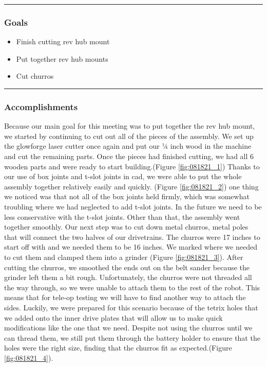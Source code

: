 \noindent\hfil\rule{\textwidth}{.4pt}\hfil
\subsubsection*{Goals}
\begin{itemize}
    \item Finish cutting rev hub mount
	\item Put together rev hub mounts
	\item Cut churros
  

\end{itemize} 

\noindent\hfil\rule{\textwidth}{.4pt}\hfil

\subsubsection*{Accomplishments}
Because our main goal for this meeting was to put together the rev hub mount, we started by continuing to cut out all of the pieces of the assembly. We set up the glowforge laser cutter once again and put our ¼ inch wood in the machine and cut the remaining parts. Once the pieces had finished cutting, we had all 6 wooden parts and were ready to start building.(Figure \ref{fig:081821_1})
Thanks to our use of box joints and t-slot joints in cad, we were able to put the whole assembly together relatively easily and quickly. (Figure \ref{fig:081821_2}) one thing we noticed was that not all of the box joints held firmly, which was somewhat troubling where we had neglected to add t-slot joints. In the future we need to be less conservative with the t-slot joints. Other than that, the assembly went together smoothly. 
Our next step was to cut down metal churros, metal poles that will connect the two halves of our drivetrains. The churros were 17 inches to start off with and we needed them to be 16 inches. We marked where we needed to cut them and clamped them into a grinder (Figure \ref{fig:081821_3}). After cutting the churros, we smoothed the ends out on the belt sander because the grinder left them a bit rough. Unfortunately, the churros were not threaded all the way through, so we were unable to attach them to the rest of the robot. This means that for tele-op testing we will have to find another way to attach the sides. Luckily, we were prepared for this scenario because of the tetrix holes that we added onto the inner drive plates that will allow us to make quick modifications like the one that we need. Despite not using the churros until we can thread them, we still put them through the battery holder to ensure that the holes were the right size, finding that the churros fit as expected.(Figure \ref{fig:081821_4}). 

